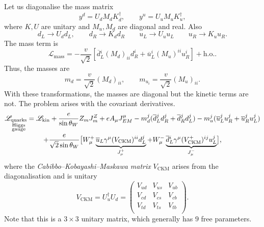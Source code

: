 Let us diagonalise the mass matrix
\begin{equation}
  y^{d} = U_{d} M_{d} K^{\dagger}_{d}, \qquad y^{u} = U_{u} M_{u} K_{u}^{\dagger},
\end{equation}
where $K, U$ are unitary and $M_u, M_d$ are diagonal and real.
Also
\begin{equation}
  d_L \to U_d d_L, \qquad d_R \to K_d d_R \qquad u_L \to U_u u_L \qquad u_R \to K_u u_R.
\end{equation}
The mass term is
\begin{equation}
  \mathscr{L}_{\text{mass}} = -\frac{v}{\sqrt{2}} \left[ \overline{d}{}^{i}_{L} (M_d)_{ii} d^{i}_{R} + \overline{u}{}^{i}_{L} (M_u)^{ii} u^{i}_R \right] + \text{h.o.}.
\end{equation}
Thus, the masses are
\begin{equation}
  m_d = \frac{v}{\sqrt{2}} (M_d)_{ii}, \qquad m_{u_i} = \frac{v}{\sqrt{2}} (M_u)_{ii}.
\end{equation}
With these transformations, the masses are diagonal but the kinetic terms are not.
The problem arises with the covariant derivatives.
\begin{multline}
  \mathscr{L}_{\substack{\text{quarks} \\ \text{Higgs} \\ \text{gauge}}} = \mathscr{L}_{\text{kin}} + \frac{e}{\sin \theta_W} Z_m J^Z_m + e A_{\mu} J^{\mu}_{EM} - m^{j}_{d} (\overline{d}{}_L^{j} d^{j}_R + \overline{d}{}^{j}_R d^{j}_L) - m^{j}_{u} (\overline{u}{}^{j}_{L} u^{j}_{R} + \overline{u}{}^{j}_{R} u^{j}_{L}) \\
  + \frac{e}{\sqrt{2} \sin \theta_W} \bigl[ W^+_{\mu} \underbrace{\overline{u}{}_L \gamma^{\mu} (V_{\text{CKM}})^{ii} d^{j}_{L}}_{\mathclap{J^+_{\mu}}} + W^-_{\mu} \underbrace{\overline{d}{}^{i}_{L} \gamma^{\mu} (V_{\text{CKM}}^+)^{ij} u_L^{j}}_{\mathclap{J^-_{\mu}}} \bigr],
\end{multline}
where the \emph{Cabibbo--Kobayashi--Maskawa matrix} $V_{\text{CKM}}$ arises from the diagonalisation and is unitary
\begin{equation}
  V_{\text{CKM}} = U^{\dagger}_u U_d = 
  \begin{pmatrix}
   V_{ud} & V_{us} & V_{ub} \\
   V_{cd} & V_{cs} & V_{cb} \\
   V_{td} & V_{ts} & V_{tb} \\
  \end{pmatrix}.
\end{equation}
Note that this is a $3 \times 3$ unitary matrix, which generally has $9$ free parameters.

